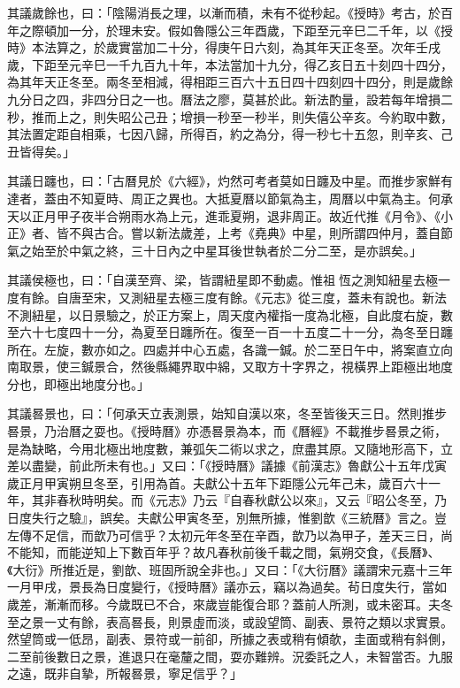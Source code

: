 其議歲餘也，曰：「陰陽消長之理，以漸而積，未有不從秒起。《授時》考古，於百年之際頓加一分，於理未安。假如魯隱公三年酉歲，下距至元辛巳二千年，以《授時》本法算之，於歲實當加二十分，得庚午日六刻，為其年天正冬至。次年壬戌歲，下距至元辛巳一千九百九十年，本法當加十九分，得乙亥日五十刻四十四分，為其年天正冬至。兩冬至相減，得相距三百六十五日四十四刻四十四分，則是歲餘九分日之四，非四分日之一也。曆法之廖，莫甚於此。新法酌量，設若每年增損二秒，推而上之，則失昭公己丑；增損一秒至一秒半，則失僖公辛亥。今約取中數，其法置定距自相乘，七因八歸，所得百，約之為分，得一秒七十五忽，則辛亥、己丑皆得矣。」

其議日躔也，曰：「古曆見於《六經》，灼然可考者莫如日躔及中星。而推步家鮮有達者，蓋由不知夏時、周正之異也。大抵夏曆以節氣為主，周曆以中氣為主。何承天以正月甲子夜半合朔雨水為上元，進乖夏朔，退非周正。故近代推《月令》、《小正》者、皆不與古合。嘗以新法歲差，上考《堯典》中星，則所謂四仲月，蓋自節氣之始至於中氣之終，三十日內之中星耳後世執者於二分二至，是亦誤矣。」

其議侯極也，曰：「自漢至齊、梁，皆謂紐星即不動處。惟祖恆之測知紐星去極一度有餘。自唐至宋，又測紐星去極三度有餘。《元志》從三度，蓋未有說也。新法不測紐星，以日景驗之，於正方案上，周天度內權指一度為北極，自此度右旋，數至六十七度四十一分，為夏至日躔所在。復至一百一十五度二十一分，為冬至日躔所在。左旋，數亦如之。四處并中心五處，各識一鍼。於二至日午中，將案直立向南取景，使三鍼景合，然後縣繩界取中綿，又取方十字界之，視橫界上距極出地度分也，即極出地度分也。」

其議晷景也，曰：「何承天立表測景，始知自漢以來，冬至皆後天三日。然則推步晷景，乃治曆之耍也。《授時曆》亦憑晷景為本，而《曆經》不載推步晷景之術，是為缺略，今用北極出地度數，兼弧矢二術以求之，庶盡其原。又隨地形高下，立差以盡變，前此所未有也。」又曰：「《授時曆》議據《前漢志》魯獻公十五年戊寅歲正月甲寅朔旦冬至，引用為首。夫獻公十五年下距隱公元年己未，歲百六十一年，其非春秋時明矣。而《元志》乃云『自春秋獻公以來』，又云『昭公冬至，乃日度失行之驗』，誤矣。夫獻公甲寅冬至，別無所據，惟劉歆《三統曆》言之。豈左傳不足信，而歆乃可信乎？太初元年冬至在辛酉，歆乃以為甲子，差天三日，尚不能知，而能逆知上下數百年乎？故凡春秋前後千載之間，氣朔交食，《長曆》、《大衍》所推近是，劉歆、班固所說全非也。」又曰：「《大衍曆》議謂宋元嘉十三年一月甲戌，景長為日度變行，《授時曆》議亦云，竊以為過矣。茍日度失行，當如歲差，漸漸而移。今歲既已不合，來歲豈能復合耶？蓋前人所測，或未密耳。夫冬至之景一丈有餘，表高晷長，則景虛而淡，或設望筒、副表、景符之類以求實景。然望筒或一低昂，副表、景符或一前卻，所據之表或稍有傾欹，圭面或稍有斜側，二至前後數日之景，進退只在毫釐之間，耍亦難辨。況委託之人，未智當否。九服之遠，既非自摯，所報晷景，寧足信乎？」

